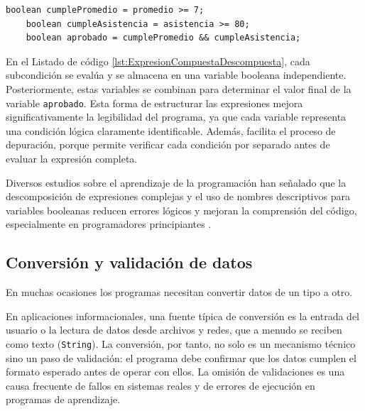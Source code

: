 \documentclass[12pt,twoside]{book}
\begin{document}
						\begin{lstlisting}[style=Java,caption={Descomposición de una expresión compuesta en subcondiciones booleanas.},label={lst:ExpresionCompuestaDescompuesta}]
	boolean cumplePromedio = promedio >= 7;
	boolean cumpleAsistencia = asistencia >= 80;
	boolean aprobado = cumplePromedio && cumpleAsistencia; \end{lstlisting}
						
						\noindent
						En el Listado de código \ref{lst:ExpresionCompuestaDescompuesta}, cada subcondición se evalúa y se almacena en una variable booleana independiente. Posteriormente, estas variables se combinan para determinar el valor final de la variable \texttt{aprobado}. Esta forma de estructurar las expresiones mejora significativamente la legibilidad del programa, ya que cada variable representa una condición lógica claramente identificable. Además, facilita el proceso de depuración, porque permite verificar cada condición por separado antes de evaluar la expresión completa.
						
						Diversos estudios sobre el aprendizaje de la programación han señalado que la descomposición de expresiones complejas y el uso de nombres descriptivos para variables booleanas reducen errores lógicos y mejoran la comprensión del código, especialmente en programadores principiantes \cite{Qian2018Students,Robins2003Learning,Lister2004Learning}.
				\subsection{Conversión y validación de datos}
					\noindent
					En muchas ocasiones los programas necesitan convertir datos de un tipo a otro.
					
					\noindent
					En aplicaciones informacionales, una fuente típica de conversión es la entrada del usuario o la lectura de datos desde archivos y redes, que a menudo se reciben como texto (\texttt{String}). La conversión, por tanto, no solo es un mecanismo técnico sino un paso de validación: el programa debe confirmar que los datos cumplen el formato esperado antes de operar con ellos. La omisión de validaciones es una causa frecuente de fallos en sistemas reales y de errores de ejecución en programas de aprendizaje.
					
\end{document}
